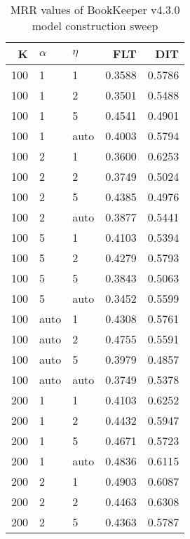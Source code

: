 
\begin{table}
\begin{spacing}{1.2}
\centering
\caption{MRR values of BookKeeper v4.3.0 model construction sweep}
\label{table:bookkeeper_model_sweep}
\vspace{0.2em}
\parbox{.45\linewidth}{\centering \begin{tabular}{rll|rr}
\toprule
   K & $\alpha$ &   $\eta$ & FLT & DIT \\
\midrule
 100 &     1 &     1 &           0.3588 & 0.5786 \\
 100 &     1 &     2 &           0.3501 & 0.5488 \\
 100 &     1 &     5 &           0.4541 & 0.4901 \\
 100 &     1 &  auto &           0.4003 & 0.5794 \\
 100 &     2 &     1 &           0.3600 & 0.6253 \\
 100 &     2 &     2 &           0.3749 & 0.5024 \\
 100 &     2 &     5 &           0.4385 & 0.4976 \\
 100 &     2 &  auto &           0.3877 & 0.5441 \\
 100 &     5 &     1 &           0.4103 & 0.5394 \\
 100 &     5 &     2 &           0.4279 & 0.5793 \\
 100 &     5 &     5 &           0.3843 & 0.5063 \\
 100 &     5 &  auto &           0.3452 & 0.5599 \\
 100 &  auto &     1 &           0.4308 & 0.5761 \\
 100 &  auto &     2 &           0.4755 & 0.5591 \\
 100 &  auto &     5 &           0.3979 & 0.4857 \\
 100 &  auto &  auto &           0.3749 & 0.5378 \\
 200 &     1 &     1 &           0.4103 & 0.6252 \\
 200 &     1 &     2 &           0.4432 & 0.5947 \\
 200 &     1 &     5 &           0.4671 & 0.5723 \\
 200 &     1 &  auto &           0.4836 & 0.6115 \\
 200 &     2 &     1 &           0.4903 & 0.6087 \\
 200 &     2 &     2 &           0.4463 & 0.6308 \\
 200 &     2 &     5 &           0.4363 & 0.5787 \\

\end{tabular}}
\end{spacing}
\end{table}
